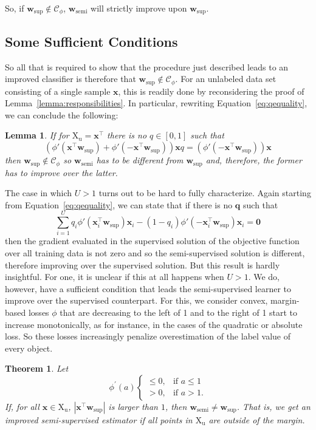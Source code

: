 \documentclass[twoside]{memoir}\usepackage[]{graphicx}\usepackage{xcolor}
\newtheorem{theorem}{Theorem}
\newtheorem{lemma}{Lemma}
\begin{document}
So, if $\mathbf{w}_\mathrm{sup} \notin \mathcal{C}_\phi$, $\mathbf{w}_\mathrm{semi}$ will strictly improve upon $\mathbf{w}_\mathrm{sup}$.

\subsection{Some Sufficient Conditions}

So all that is required to show that the procedure just described leads to an improved classifier is therefore that $\mathbf{w}_\mathrm{sup} \notin \mathcal{C}_\phi$.  For an unlabeled data set consisting of a single sample $\mathbf{x}$, this is readily done by reconsidering the proof of Lemma~\ref{lemma:responsibilities}. In particular, rewriting Equation~\eqref{eq:qequality}, we can conclude the following:
\begin{lemma}
If for $\mathrm{X}_\mathrm{u} = \mathbf{x}^\top$ there is no $q \in [0,1]$ such that
\[
(\phi'(\mathbf{x}^\top \mathbf{w}_\mathrm{sup}) + \phi'(-\mathbf{x}^\top \mathbf{w}_\mathrm{sup})) \mathbf{x} q = (\phi'(-\mathbf{x}^\top \mathbf{w}_\mathrm{sup})) \mathbf{x}
\]
then $\mathbf{w}_\mathrm{sup} \notin \mathcal{C}_\phi$ so $\mathbf{w}_\mathrm{semi}$ has to be different from $\mathbf{w}_\mathrm{sup}$ and, therefore, the former has to improve over the latter.
\end{lemma}

The case in which $U>1$ turns out to be hard to fully characterize.  Again starting from Equation~\eqref{eq:qequality}, we can state that if there is no $\mathbf{q}$ such that
\[
\sum_{i=1}^U  q_i \phi'(\mathbf{x}_i^\top \mathbf{w}_\mathrm{sup}) \mathbf{x}_i - (1-q_i) \phi'(-\mathbf{x}_i^\top \mathbf{w}_\mathrm{sup}) \mathbf{x}_i = \mathbf{0}
\]
then the gradient evaluated in the supervised solution of the objective function over all training data is not zero and so the semi-supervised solution is different, therefore improving over the supervised solution.  But this result is hardly insightful. For one, it is unclear if this at all happens when $U>1$.  We do, however, have a sufficient condition that leads the semi-supervised learner to improve over the supervised counterpart.  For this, we consider convex, margin-based losses $\phi$ that are decreasing to the left of 1 and to the right of 1 start to increase monotonically, as for instance, in the cases of the quadratic or absolute loss.  So these losses increasingly penalize overestimation of the label value of every object.
\begin{theorem}\label{eq:possible}
Let
\[
\phi^\prime(a)
\begin{cases}
\le 0, & \text{if $a \le 1$}\\
> 0, & \text{if $a > 1$.}
\end{cases}
\]
If, for all $\mathbf{x} \in \mathrm{X}_\mathrm{u}$, $|\mathbf{x}^\top \mathbf{w}_\mathrm{sup}|$ is larger than $1$, then $\mathbf{w}_\mathrm{semi} \neq \mathbf{w}_\mathrm{sup}$.  That is, we get an improved semi-supervised estimator if all points in $\mathrm{X}_\mathrm{u}$ are outside of the margin.
\end{theorem}
\end{document}
